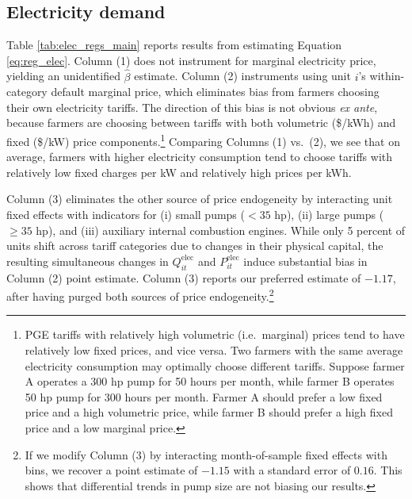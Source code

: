 %
%

\subsection{Electricity demand}

Table \ref{tab:elec_regs_main} reports  results from estimating Equation \ref{eq:reg_elec}. Column (1)  does not instrument for marginal electricity price, yielding an unidentified $\hat\beta$ estimate. 
Column (2) instruments using unit $i$'s within-category default marginal price, which eliminates bias from farmers choosing their own electricity tariffs. The direction of this bias is not obvious \emph{ex ante}, because farmers are choosing between tariffs with both volumetric (\$/kWh) and fixed (\$/kW) price components.\footnote{
PGE tariffs with relatively high volumetric (i.e.\ marginal) prices tend to have relatively low fixed prices, and vice versa. Two farmers with the same average electricity consumption may optimally choose different tariffs. Suppose farmer A operates a 300 hp pump for 50 hours per month, while farmer B operates 50 hp pump for 300 hours per month. Farmer A should prefer a low fixed price and a high volumetric price, while farmer B should prefer a high fixed price and a low marginal price.
}
Comparing Columns (1) vs.\ (2), we see that on average, farmers with higher electricity consumption tend to choose  tariffs with relatively low fixed charges per kW and relatively high prices per kWh.

Column (3) eliminates the other source of price endogeneity by interacting unit fixed effects with indicators for (i) small pumps ($<35$ hp), (ii) large pumps ($\ge35$ hp), and (iii) auxiliary internal combustion engines. While only 5 percent of units shift across tariff categories due to changes in their physical capital, the resulting simultaneous changes in $Q^{\text{elec}}_{it}$ and $P^{\text{elec}}_{it}$ induce substantial bias in Column (2) point estimate. Column (3) reports our preferred estimate of $-1.17$, after having purged both sources of price endogeneity.\footnote{If we modify Column (3) by interacting month-of-sample fixed effects with bins, we recover a point estimate of $-1.15$ with a standard error of $0.16$. This shows that differential trends in pump size are not biasing our results.}

